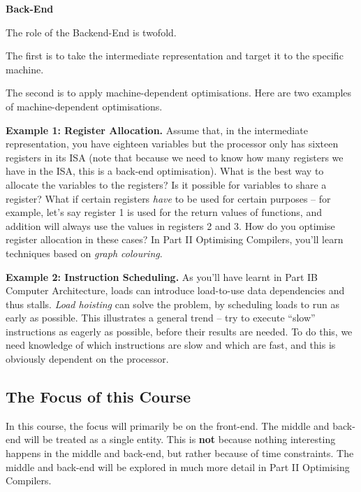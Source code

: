 \begin{minipage}[t]{0.15\textwidth}
\textbf{\sffamily Back-End}    
\end{minipage}%
\begin{minipage}[t]{0.85\textwidth}
    \setlength{\parskip}{.5\baselineskip}
    The role of the Backend-End is twofold. 

    The first is to take the intermediate representation and target it to the specific machine. 

    The second is to apply machine-dependent optimisations. Here are two examples of machine-dependent optimisations.
        
    \textbf{Example 1: Register Allocation.} Assume that, in the intermediate representation, you have eighteen variables but the processor only has sixteen registers in its ISA (note that because we need to know how many registers we have in the ISA, this is a back-end optimisation). What is the best way to allocate the variables to the registers? Is it possible for variables to share a register? What if certain registers \emph{have} to be used for certain purposes -- for example, let's say register 1 is used for the return values of functions, and addition will always use the values in registers 2 and 3. How do you optimise register allocation in these cases? In {\sffamily Part II Optimising Compilers}, you'll learn techniques based on \emph{graph colouring}.
    
    \textbf{Example 2: Instruction Scheduling.} As you'll have learnt in {\sffamily Part IB Computer Architecture}, loads can introduce load-to-use data dependencies and thus stalls. \textit{Load hoisting} can solve the problem, by scheduling loads to run as early as possible. This illustrates a general trend -- try to execute ``slow'' instructions as eagerly as possible, before their results are needed. To do this, we need knowledge of which instructions are slow and which are fast, and this is obviously dependent on the processor.
\end{minipage}

\subsection{The Focus of this Course}
In this course, the focus will primarily be on the front-end. The middle and back-end will be treated as a single entity. This is \textbf{not} because nothing interesting happens in the middle and back-end, but rather because of time constraints. The middle and back-end will be explored in much more detail in \textsf{Part II Optimising Compilers}.

